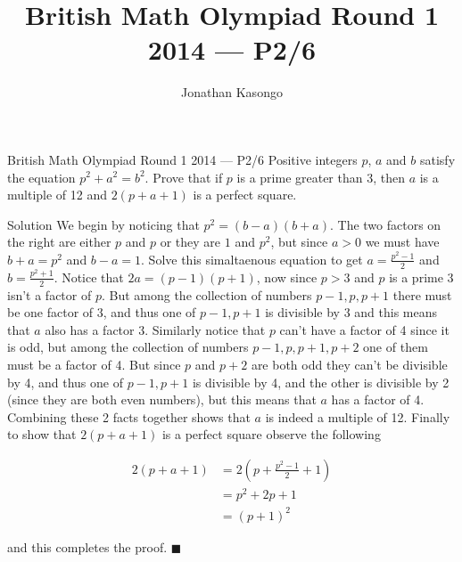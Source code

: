 \documentclass{article}
\author{Jonathan Kasongo}
\title{British Math Olympiad Round 1 2014 --- P2/6}
\begin{document}
\maketitle

\begin{problem}{British Math Olympiad Round 1 2014 --- P2/6}
Positive integers $p$, $a$ and $b$ satisfy the equation $p^2 + a^2 = b^2$.
Prove that if $p$ is a prime greater than 3, then $a$ is a multiple of 12
and $2(p + a + 1)$ is a perfect square.
\end{problem}

\begin{solution}{Solution}
We begin by noticing that $p^2 = (b - a)(b + a)$. The two factors on the
right are either $p$ and $p$ or they are $1$ and $p^2$, but since $a > 0$
we must have $b + a = p^2$ and $b - a = 1$. Solve this simaltaenous equation
to get $a = \frac{p^2 - 1}{2}$ and $b = \frac{p^2 + 1}{2}$. Notice that
$2a = (p - 1)(p + 1)$, now since $p > 3$ and $p$ is a prime 3 isn't a
factor of $p$. But among the collection of numbers $p-1, p, p+1$ there must
be one factor of 3, and thus one of $p-1, p+1$ is divisible by 3 and this
means that $a$ also has a factor 3. Similarly notice that $p$ can't have
a factor of 4 since it is odd, but among the collection of numbers
$p-1, p, p+1, p+2$ one of them must be a factor of 4. But since $p$ and
$p+2$ are both odd they can't be divisible by 4, and thus one of $p-1, p+1$
is divisible by 4, and the other is divisible by 2 (since they are both
even numbers), but this means that $a$ has a factor of 4. Combining these
2 facts together shows that $a$ is indeed a multiple of 12. Finally
to show that $2(p + a + 1)$ is a perfect square observe the following

\[
\begin{aligned}
2(p + a + 1) &= 2\left(p + \frac{p^2 - 1}{2} + 1\right)\\
&= p^2 + 2p + 1 \\
&= (p+1)^2
\end{aligned}
\]

and this completes the proof. $\blacksquare$
\end{solution}
\end{document}
